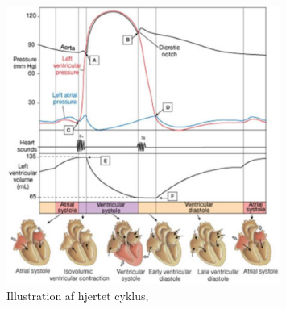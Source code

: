 \begin{figure}[H]
	\centering
	\includegraphics[width=0.8\textwidth]{Figurer/Snip20151209_68}
	\caption{Illustration af hjertet cyklus, \protect\cite[s. 33]{Hjertecyklus}}
\end{figure}

